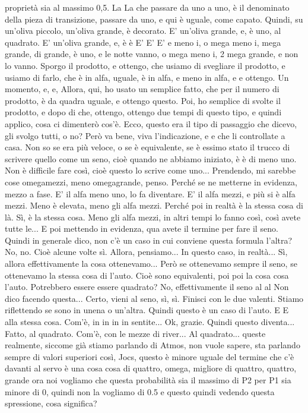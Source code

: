 \begin{soluzione}
{proprietà sia al massimo 0,5. La La che passare da uno a uno, è il denominato della pieza di transizione, passare da uno, e qui è uguale, come capato. Quindi, su un'oliva piccolo, un'oliva grande, è decorato. E' un'oliva grande, e, è uno, al quadrato. E' un'oliva grande, e, è è E' E' E' e meno i, o mega meno i, mega grande, di grande, è uno, e le notte vanno, o mega meno i, 2 mega grande, e non lo vanno. Sporgo il prodotto, e ottengo, che usiamo di svegliare il prodotto, e usiamo di farlo, che è in alfa, uguale, è in alfa, e meno in alfa, e e ottengo. Un momento, e, e, Allora, qui, ho usato un semplice fatto, che per il numero di prodotto, è da quadra uguale, e ottengo questo. Poi, ho semplice di svolte il prodotto, e dopo di che, ottengo, ottengo due tempi di questo tipo, e quindi applico, cosa ci dimenterò cos'è. Ecco, questo era il tipo di passaggio che dicevo, gli svolgo tutti, o no? Però va bene, viva l'indicazione, e e che li controllate a casa. Non so se era più veloce, o se è equivalente, se è essimo stato il trucco di scrivere quello come un seno, cioè quando ne abbiamo iniziato, è è di meno uno. Non è difficile fare così, cioè questo lo scrive come uno... Prendendo, mi sarebbe cose omegamezzi, meno omegagrande, penso. Perché se ne metterne in evidenza, mezzo a fase. E' il alfa meno uno, lo fa diventare. E' il alfa mezzi, e più si è alfa mezzi. Meno è elevata, meno gli alfa mezzi. Perché poi in realtà è la stessa cosa di là. Sì, è la stessa cosa. Meno gli alfa mezzi, in altri tempi lo fanno così, così avete tutte le... E poi mettendo in evidenza, qua avete il termine per fare il seno. Quindi in generale dico, non c'è un caso in cui conviene questa formula l'altra? No, no. Cioè alcune volte sì. Allora, pensiamo... In questo caso, in realtà... Sì, allora effettivamente la cosa ottenevamo... Però se ottenevamo sempre il seno, se ottenevamo la stessa cosa di l'auto. Cioè sono equivalenti, poi poi la cosa cosa l'auto. Potrebbero essere essere quadrato? No, effettivamente il seno al al Non dico facendo questa... Certo, vieni al seno, sì, sì. Finisci con le due valenti. Stiamo riflettendo se sono in unena o un'altra. Quindi questo è un caso di l'auto. E E alla stessa cosa. Com'è, in in in in sentite... Ok, grazie. Quindi questo diventa... Fatto, al quadrato. Com'è, con le mezze di river... Al quadrato... queste realmente, siccome già stiamo parlando di Atmos, non vuole sapere, sta parlando sempre di valori superiori così, Jocs, questo è minore uguale del termine che c'è davanti al servo è una cosa cosa di quattro, omega, migliore di quattro, quattro, grande ora noi vogliamo che questa probabilità sia il massimo di P2 per P1 sia minore di 0, quindi non la vogliamo di 0.5 e questo quindi vedendo questa spressione, cosa significa? 
   
}
\end{soluzione}
